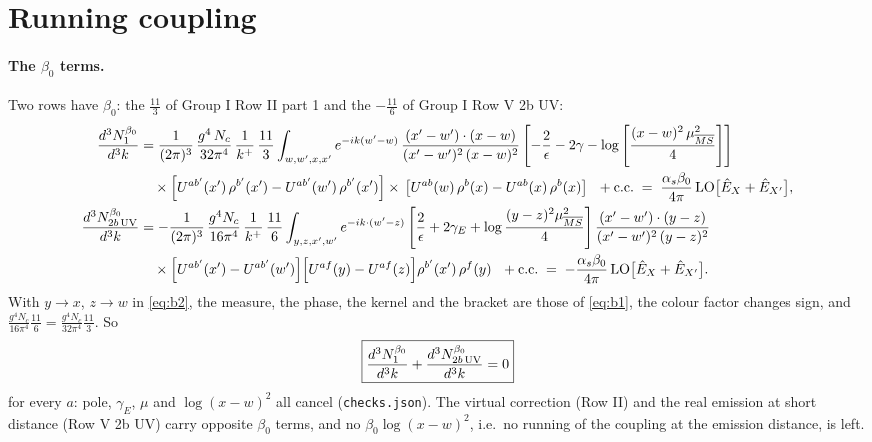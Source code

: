 \documentclass[9pt]{article}
\numberwithin{equation}{section}
\begin{document}
\section{Running coupling}\label{sec:rc}
\paragraph{The $\beta_0$ terms.} Two rows have $\beta_0$: the $\frac{11}{3}$ of Group I Row II part 1 and the $-\frac{11}{6}$ of Group I Row V 2b UV:
\begin{align}
\frac{d^{3}N^{\beta_0}_{1}}{d^{3}k}&=\frac{1}{(2\pi)^{3}}\,\frac{g^{4}\,N_{c}}{32\pi^{4}}\,\frac{1}{k^{+}}\,\frac{11}{3}\int_{w,w',x,x'}e^{-ik(w'-w)}\,\frac{(x'-w')\cdot (x-w)}{(x'-w')^{2}\, (x-w)^{2}}\left[-\frac{2}{\epsilon}-2\gamma-\log{\left[\frac{(x-w)^{2}\,\mu^{2}_{\overline{MS}}}{4}\right]}\right]\notag\\
&\quad\times\left[U^{ab'}(x')\,\rho^{b'}(x') - U^{ab'}(w')\,\rho^{b'}(x')\right]\times\,\left[U^{ab}(w)\,\rho^{b}(x) - U^{ab}(x)\,\rho^{b}(x)\right]\ \ +{\rm c.c.}\;=\;\frac{\alpha_s\beta_0}{4\pi}\,{\rm LO}\big[\hat E_X+\hat E_{X'}\big],\label{eq:b1}\\
\frac{d^{3}N^{\beta_0}_{2b\,\rm UV}}{d^{3}k}&=-\frac{1}{(2\pi)^{3}}\,\frac{g^{4}N_{c}}{16\pi^{4}}\,\frac{1}{k^{+}}\,\frac{11}{6}\int_{y,z,x',w'}e^{-ik\cdot(w'-z)}\left[\frac{2}{\epsilon}+2\gamma_{E}+\log\frac{(y-z)^{2}\mu^{2}_{\overline{MS}}}{4}\right]\frac{(x'-w')\cdot(y-z)}{(x'-w')^{2}\,(y-z)^{2}}\notag\\
&\quad\times\Big[U^{ab'}(x')-U^{ab'}(w')\Big]\Big[U^{af}(y)-U^{af}(z)\Big]\rho^{b'}(x')\,\rho^{f}(y)\ \ +{\rm c.c.}\;=\;-\frac{\alpha_s\beta_0}{4\pi}\,{\rm LO}\big[\hat E_X+\hat E_{X'}\big].\label{eq:b2}
\end{align}
With $y\to x$, $z\to w$ in \eqref{eq:b2}, the measure, the phase, the kernel and the bracket are those of \eqref{eq:b1}, the colour factor changes sign, and $\frac{g^4N_c}{16\pi^4}\frac{11}{6}=\frac{g^4N_c}{32\pi^4}\frac{11}{3}$. So
\begin{equation}
\boxed{\frac{d^{3}N^{\beta_0}_{1}}{d^{3}k}+\frac{d^{3}N^{\beta_0}_{2b\,\rm UV}}{d^{3}k}=0}
\end{equation}
for every $a$: pole, $\gamma_E$, $\mu$ and $\log(x-w)^2$ all cancel (\texttt{checks.json}). The virtual correction (Row II) and the real emission at short distance (Row V 2b UV) carry opposite $\beta_0$ terms, and no $\beta_0\log(x-w)^2$, i.e.\ no running of the coupling at the emission distance, is left.
\end{document}
